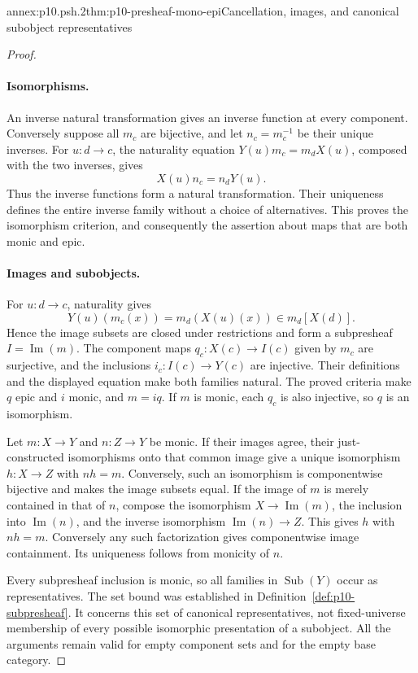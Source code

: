 \begin{annexitem}{annex:p10.psh.2}{thm:p10-presheaf-mono-epi}{Cancellation, images, and canonical subobject representatives}
\begin{proof}
\paragraph{Isomorphisms.}
An inverse natural transformation gives an inverse
function at every component.
Conversely suppose all \(m_c\) are bijective, and let
\(n_c=m_c^{-1}\) be their unique inverses.
For \(u:d\to c\), the naturality equation
\(Y(u)m_c=m_d X(u)\), composed with the two inverses,
gives
\[
                              X(u)n_c=n_dY(u).
\]
Thus the inverse functions form a natural transformation.
Their uniqueness defines the entire inverse family
without a choice of alternatives.
This proves the isomorphism criterion, and consequently
the assertion about maps that are both monic and epic.

\paragraph{Images and subobjects.}
For \(u:d\to c\), naturality gives
\[
             Y(u)(m_c(x))=m_d(X(u)(x))\in m_d[X(d)].
\]
Hence the image subsets are closed under restrictions
and form a subpresheaf \(I=\operatorname{Im}(m)\).
The component maps \(q_c:X(c)\to I(c)\) given by \(m_c\)
are surjective, and the inclusions \(i_c:I(c)\to Y(c)\)
are injective.  Their definitions and the displayed
equation make both families natural.
The proved criteria make \(q\) epic and \(i\) monic,
and \(m=iq\).
If \(m\) is monic, each \(q_c\) is also injective,
so \(q\) is an isomorphism.

Let \(m:X\to Y\) and \(n:Z\to Y\) be monic.
If their images agree, their just-constructed isomorphisms
onto that common image give a unique isomorphism
\(h:X\to Z\) with \(nh=m\).
Conversely, such an isomorphism is componentwise bijective
and makes the image subsets equal.
If the image of \(m\) is merely contained in that of \(n\),
compose the isomorphism \(X\to\operatorname{Im}(m)\),
the inclusion into \(\operatorname{Im}(n)\), and the
inverse isomorphism \(\operatorname{Im}(n)\to Z\).
This gives \(h\) with \(nh=m\).
Conversely any such factorization gives componentwise
image containment.  Its uniqueness follows from monicity
of \(n\).

Every subpresheaf inclusion is monic, so all families in
\(\operatorname{Sub}(Y)\) occur as representatives.
The set bound was established in
Definition~\ref{def:p10-subpresheaf}.
It concerns this set of canonical representatives, not
fixed-universe membership of every possible isomorphic
presentation of a subobject.
All the arguments remain valid for empty component sets
and for the empty base category.
\end{proof}
\end{annexitem}
